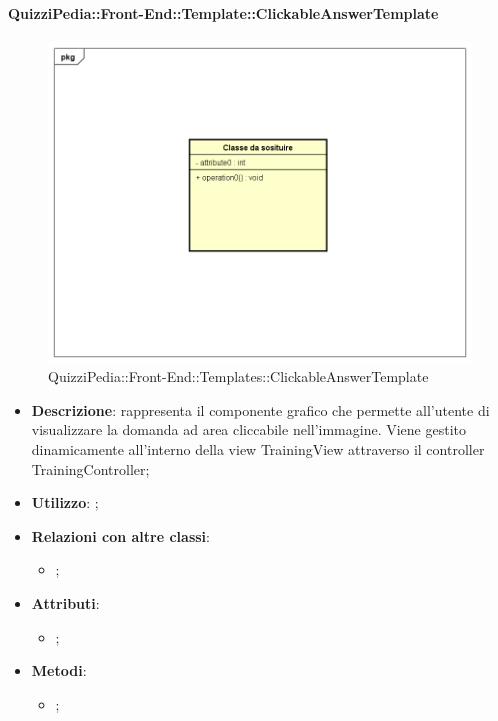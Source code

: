		\paragraph{QuizziPedia::Front-End::Template::ClickableAnswerTemplate}
		
				\label{QuizziPedia::Front-End::Templates::ClickableAnswerTemplate}

				\begin{figure}[h]
					\centering
					\includegraphics[scale=0.5,keepaspectratio]{UML/Classi/Front-End/Temporanea.png}
					\caption{QuizziPedia::Front-End::Templates::ClickableAnswerTemplate}
				\end{figure}
		
			\begin{itemize}
				\item \textbf{Descrizione}: rappresenta il componente grafico che permette all'utente di visualizzare la domanda ad area cliccabile nell'immagine. Viene gestito dinamicamente all'interno della view TrainingView attraverso il controller TrainingController;
				\item \textbf{Utilizzo}: ;
				\item \textbf{Relazioni con altre classi}: 
				\begin{itemize}
					\item ;
				\end{itemize}
				\item \textbf{Attributi}: 
				\begin{itemize}
					\item ;
				\end{itemize}
				\item \textbf{Metodi}: 
				\begin{itemize}
					\item ;
				\end{itemize}
			\end{itemize}
			
